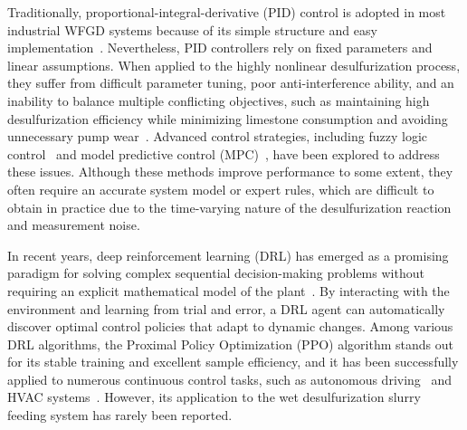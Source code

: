 \documentclass[12pt,a4paper]{article}
\begin{document}
Traditionally, proportional-integral-derivative (PID) control is adopted in most industrial WFGD systems because of its simple structure and easy implementation~\cite{astrom1995}. Nevertheless, PID controllers rely on fixed parameters and linear assumptions. When applied to the highly nonlinear desulfurization process, they suffer from difficult parameter tuning, poor anti-interference ability, and an inability to balance multiple conflicting objectives, such as maintaining high desulfurization efficiency while minimizing limestone consumption and avoiding unnecessary pump wear~\cite{liu2018}. Advanced control strategies, including fuzzy logic control~\cite{si2016} and model predictive control (MPC)~\cite{lee2011}, have been explored to address these issues. Although these methods improve performance to some extent, they often require an accurate system model or expert rules, which are difficult to obtain in practice due to the time-varying nature of the desulfurization reaction and measurement noise.

In recent years, deep reinforcement learning (DRL) has emerged as a promising paradigm for solving complex sequential decision-making problems without requiring an explicit mathematical model of the plant~\cite{mnih2015}. By interacting with the environment and learning from trial and error, a DRL agent can automatically discover optimal control policies that adapt to dynamic changes. Among various DRL algorithms, the Proximal Policy Optimization (PPO) algorithm stands out for its stable training and excellent sample efficiency, and it has been successfully applied to numerous continuous control tasks, such as autonomous driving~\cite{schulman2017} and HVAC systems~\cite{wei2017}. However, its application to the wet desulfurization slurry feeding system has rarely been reported.
\end{document}
